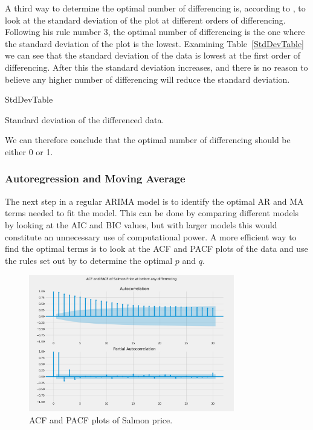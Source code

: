 A third way to determine the optimal number of differencing is, according to \textcite{nau_2019}, to look at the standard deviation of the plot at different orders of differencing. Following his rule number 3, the optimal number of differencing is the one where the standard deviation of the plot is the lowest. Examining Table~\ref{StdDevTable} we can see that the standard deviation of the data is lowest at the first order of differencing. After this the standard deviation increases, and there is no reason to believe any higher number of differencing will reduce the standard deviation. 

\begin{table}[H]
    \begin{center}
        {StdDevTable}
        \caption{\label{StdDevTable}Standard deviation of the differenced data.}
    \end{center}
\end{table}

We can therefore conclude that the optimal number of differencing should be either 0 or 1.

\subsubsection{Autoregression and Moving Average}
The next step in a regular ARIMA model is to identify the optimal AR and MA terms needed to fit the model. This can be done by comparing different models by looking at the AIC and BIC values, but with larger models this would constitute an unnecessary use of computational power. A more efficient way to find the optimal terms is to look at the ACF and PACF plots of the data and use the rules set out by \textcite{nau_2019} to determine the optimal $p$ and $q$. 
\begin{figure}[H]
    \centering
    \includegraphics[width=0.8\textwidth]{data/Figures/ARIMA/OrigACF-PACF_30.png}
    \caption[ACF and PACF plots of Salmon price]{ACF and PACF plots of Salmon price.}\label{fig:Orig_ACF_PACF}
\end{figure}

